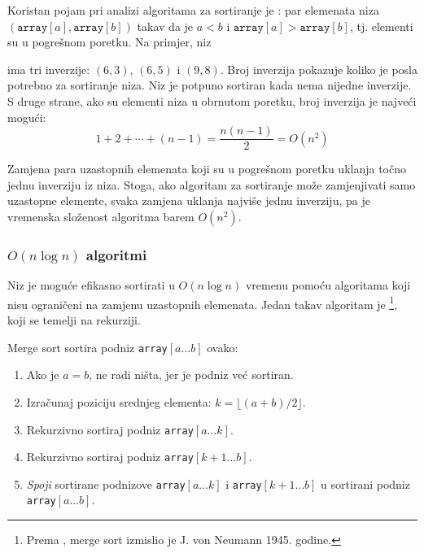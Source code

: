 Koristan pojam pri analizi algoritama
za sortiranje je :
par elemenata niza
$(\texttt{array}[a],\texttt{array}[b])$ takav da je
$a<b$ i $\texttt{array}[a]>\texttt{array}[b]$,
tj. elementi su u pogrešnom poretku.
Na primjer, niz
\begin{center}
\end{center}
ima tri inverzije: $(6,3)$, $(6,5)$ i $(9,8)$.
Broj inverzija pokazuje
koliko je posla potrebno za sortiranje niza.
Niz je potpuno sortiran kada
nema nijedne inverzije.
S druge strane, ako su elementi niza
u obrnutom poretku,
broj inverzija je najveći mogući:
\[1+2+\cdots+(n-1)=\frac{n(n-1)}{2} = O(n^2)\]

Zamjena para uzastopnih elemenata koji su
u pogrešnom poretku uklanja točno jednu inverziju
iz niza.
Stoga, ako algoritam za sortiranje može
zamjenjivati samo uzastopne elemente, svaka zamjena uklanja
najviše jednu inverziju, pa je vremenska složenost
algoritma barem $O(n^2)$.

\subsubsection{$O(n \log n)$ algoritmi}


Niz je moguće efikasno sortirati
u $O(n \log n)$ vremenu pomoću algoritama
koji nisu ograničeni na zamjenu uzastopnih elemenata.
Jedan takav algoritam je \footnote{Prema \cite{knu983},
merge sort izmislio je J. von Neumann 1945. godine.},
koji se temelji na rekurziji.

Merge sort sortira podniz \texttt{array}$[a \ldots b]$ ovako:

\begin{enumerate}
\item Ako je $a=b$, ne radi ništa, jer je podniz već sortiran.
\item Izračunaj poziciju srednjeg elementa: $k=\lfloor (a+b)/2 \rfloor$.
\item Rekurzivno sortiraj podniz \texttt{array}$[a \ldots k]$.
\item Rekurzivno sortiraj podniz \texttt{array}$[k+1 \ldots b]$.
\item \emph{Spoji} sortirane podnizove \texttt{array}$[a \ldots k]$ i
\texttt{array}$[k+1 \ldots b]$
u sortirani podniz \texttt{array}$[a \ldots b]$.
\end{enumerate}

